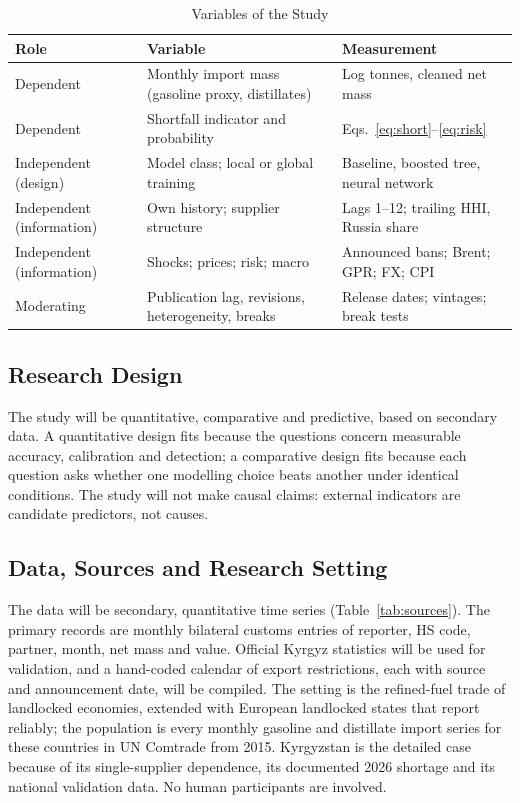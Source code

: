 \documentclass[conference]{IEEEtran}
\begin{document}
\begin{table}[t]
\caption{Variables of the Study}
\label{tab:vars}
\centering
\footnotesize
\begin{tabularx}{\columnwidth}{@{}L{1.6cm}XX@{}}
\toprule
Role & Variable & Measurement \\
\midrule
Dependent & Monthly import mass (gasoline proxy, distillates) & Log tonnes, cleaned net mass \\
Dependent & Shortfall indicator and probability & Eqs.~\eqref{eq:short}--\eqref{eq:risk} \\
Independent (design) & Model class; local or global training & Baseline, boosted tree, neural network \\
Independent (information) & Own history; supplier structure & Lags 1--12; trailing HHI, Russia share \\
Independent (information) & Shocks; prices; risk; macro & Announced bans; Brent; GPR; FX; CPI \\
Moderating & Publication lag, revisions, heterogeneity, breaks & Release dates; vintages; break tests \\
\bottomrule
\end{tabularx}
\end{table}

\subsection{Research Design}
The study will be quantitative, comparative and predictive, based on secondary data. A quantitative design fits because the questions concern measurable accuracy, calibration and detection; a comparative design fits because each question asks whether one modelling choice beats another under identical conditions. The study will not make causal claims: external indicators are candidate predictors, not causes.

\subsection{Data, Sources and Research Setting}
The data will be secondary, quantitative time series (Table~\ref{tab:sources}). The primary records are monthly bilateral customs entries of reporter, HS code, partner, month, net mass and value. Official Kyrgyz statistics will be used for validation, and a hand-coded calendar of export restrictions, each with source and announcement date, will be compiled. The setting is the refined-fuel trade of landlocked economies, extended with European landlocked states that report reliably; the population is every monthly gasoline and distillate import series for these countries in UN Comtrade from 2015. Kyrgyzstan is the detailed case because of its single-supplier dependence, its documented 2026 shortage and its national validation data. No human participants are involved.
\end{document}
